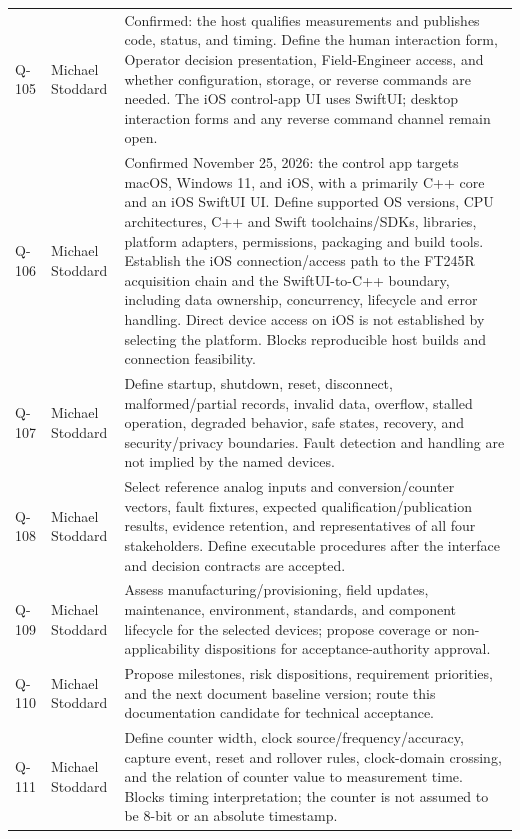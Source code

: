 \begin{tabularx}{\linewidth}{L{1.3cm}L{3.1cm}Y}
\label{Question:Q-105}Q-105 & Michael Stoddard & Confirmed: the host qualifies measurements and publishes code, status, and timing. Define the human interaction form, Operator decision presentation, Field-Engineer access, and whether configuration, storage, or reverse commands are needed. The iOS control-app UI uses SwiftUI; desktop interaction forms and any reverse command channel remain open.\\
\label{Question:Q-106}Q-106 & Michael Stoddard & Confirmed November 25, 2026: the control app targets macOS, Windows 11, and iOS, with a primarily C++ core and an iOS SwiftUI UI. Define supported OS versions, CPU architectures, C++ and Swift toolchains/SDKs, libraries, platform adapters, permissions, packaging and build tools. Establish the iOS connection/access path to the FT245R acquisition chain and the SwiftUI-to-C++ boundary, including data ownership, concurrency, lifecycle and error handling. Direct device access on iOS is not established by selecting the platform. Blocks reproducible host builds and connection feasibility.\\
\label{Question:Q-107}Q-107 & Michael Stoddard & Define startup, shutdown, reset, disconnect, malformed/partial records, invalid data, overflow, stalled operation, degraded behavior, safe states, recovery, and security/privacy boundaries. Fault detection and handling are not implied by the named devices.\\
\label{Question:Q-108}Q-108 & Michael Stoddard & Select reference analog inputs and conversion/counter vectors, fault fixtures, expected qualification/publication results, evidence retention, and representatives of all four stakeholders. Define executable procedures after the interface and decision contracts are accepted.\\
\label{Question:Q-109}Q-109 & Michael Stoddard & Assess manufacturing/provisioning, field updates, maintenance, environment, standards, and component lifecycle for the selected devices; propose coverage or non-applicability dispositions for acceptance-authority approval.\\
\label{Question:Q-110}Q-110 & Michael Stoddard & Propose milestones, risk dispositions, requirement priorities, and the next document baseline version; route this documentation candidate for technical acceptance.\\
\label{Question:Q-111}Q-111 & Michael Stoddard & Define counter width, clock source/frequency/accuracy, capture event, reset and rollover rules, clock-domain crossing, and the relation of counter value to measurement time. Blocks timing interpretation; the counter is not assumed to be 8-bit or an absolute timestamp.\\

\end{tabularx}
